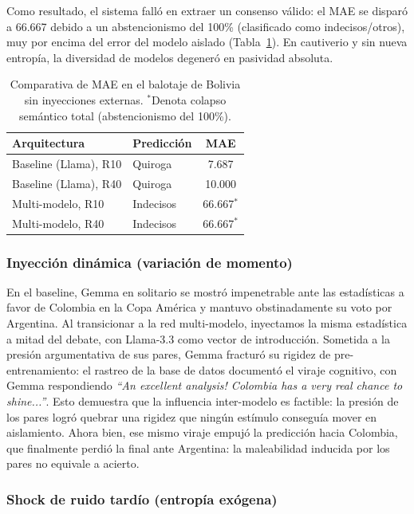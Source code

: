 \documentclass[11pt]{article}
\begin{document}
Como resultado, el sistema falló en extraer un consenso válido: el MAE se disparó a 66.667 debido a un abstencionismo del 100\% (clasificado como indecisos/otros), muy por encima del error del modelo aislado (Tabla~\ref{tab:collapse}). En cautiverio y sin nueva entropía, la diversidad de modelos degeneró en pasividad absoluta.

\begin{table}[t]
\centering
\small
\begin{tabular}{@{}llc@{}}
\toprule
\textbf{Arquitectura} & \textbf{Predicción} & \textbf{MAE} \\
\midrule
Baseline (Llama), R10 & Quiroga & 7.687 \\
Baseline (Llama), R40 & Quiroga & 10.000 \\
Multi-modelo, R10 & Indecisos & 66.667$^{*}$ \\
Multi-modelo, R40 & Indecisos & 66.667$^{*}$ \\
\bottomrule
\end{tabular}
\caption{Comparativa de MAE en el balotaje de Bolivia sin inyecciones externas. $^{*}$Denota colapso semántico total (abstencionismo del 100\%).}
\label{tab:collapse}
\end{table}

\subsubsection{Inyección dinámica (variación de momento)}

En el baseline, Gemma en solitario se mostró impenetrable ante las estadísticas a favor de Colombia en la Copa América y mantuvo obstinadamente su voto por Argentina. Al transicionar a la red multi-modelo, inyectamos la misma estadística a mitad del debate, con Llama-3.3 como vector de introducción. Sometida a la presión argumentativa de sus pares, Gemma fracturó su rigidez de pre-entrenamiento: el rastreo de la base de datos documentó el viraje cognitivo, con Gemma respondiendo \textit{``An excellent analysis! Colombia has a very real chance to shine...''}. Esto demuestra que la influencia inter-modelo es factible: la presión de los pares logró quebrar una rigidez que ningún estímulo conseguía mover en aislamiento. Ahora bien, ese mismo viraje empujó la predicción hacia Colombia, que finalmente perdió la final ante Argentina: la maleabilidad inducida por los pares no equivale a acierto.

\subsubsection{Shock de ruido tardío (entropía exógena)}
\end{document}
